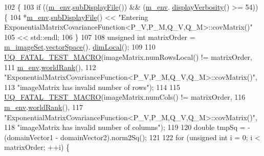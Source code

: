 \begin{DoxyCode}
102 \{
103   \textcolor{keywordflow}{if} ((\hyperlink{class_q_u_e_s_o_1_1_base_matrix_covariance_function_a2bf98f6576db775109e240a2d828c578}{m\_env}.\hyperlink{class_q_u_e_s_o_1_1_base_environment_a8a0064746ae8dddfece4229b9ad374d6}{subDisplayFile}()) && (\hyperlink{class_q_u_e_s_o_1_1_base_matrix_covariance_function_a2bf98f6576db775109e240a2d828c578}{m\_env}.
      \hyperlink{class_q_u_e_s_o_1_1_base_environment_a1fe5f244fc0316a0ab3e37463f108b96}{displayVerbosity}() >= 54)) \{
104     *\hyperlink{class_q_u_e_s_o_1_1_base_matrix_covariance_function_a2bf98f6576db775109e240a2d828c578}{m\_env}.\hyperlink{class_q_u_e_s_o_1_1_base_environment_a8a0064746ae8dddfece4229b9ad374d6}{subDisplayFile}() << \textcolor{stringliteral}{"Entering
       ExponentialMatrixCovarianceFunction<P\_V,P\_M,Q\_V,Q\_M>::covMatrix()"}
105                           << std::endl;
106   \}
107 
108   \textcolor{keywordtype}{unsigned} \textcolor{keywordtype}{int} matrixOrder = \hyperlink{class_q_u_e_s_o_1_1_base_matrix_covariance_function_aa6e05a29048771a3a327b82cea09d480}{m\_imageSet}.\hyperlink{class_q_u_e_s_o_1_1_vector_set_a923421590baf5bf93cf066e528f927dc}{vectorSpace}().
      \hyperlink{class_q_u_e_s_o_1_1_vector_space_a5829a1f4f996f8307c840b705144d666}{dimLocal}();
109 
110   \hyperlink{_defines_8h_a56d63d18d0a6d45757de47fcc06f574d}{UQ\_FATAL\_TEST\_MACRO}(imageMatrix.numRowsLocal() != matrixOrder,
111                       \hyperlink{class_q_u_e_s_o_1_1_base_matrix_covariance_function_a2bf98f6576db775109e240a2d828c578}{m\_env}.\hyperlink{class_q_u_e_s_o_1_1_base_environment_a78b57112bbd0e6dd0e8afec00b40ffa7}{worldRank}(),
112                       \textcolor{stringliteral}{"ExponentialMatrixCovarianceFunction<P\_V,P\_M,Q\_V,Q\_M>::covMatrix()"},
113                       \textcolor{stringliteral}{"imageMatrix has invalid number of rows"});
114 
115   \hyperlink{_defines_8h_a56d63d18d0a6d45757de47fcc06f574d}{UQ\_FATAL\_TEST\_MACRO}(imageMatrix.numCols() != matrixOrder,
116                       \hyperlink{class_q_u_e_s_o_1_1_base_matrix_covariance_function_a2bf98f6576db775109e240a2d828c578}{m\_env}.\hyperlink{class_q_u_e_s_o_1_1_base_environment_a78b57112bbd0e6dd0e8afec00b40ffa7}{worldRank}(),
117                       \textcolor{stringliteral}{"ExponentialMatrixCovarianceFunction<P\_V,P\_M,Q\_V,Q\_M>::covMatrix()"},
118                       \textcolor{stringliteral}{"imageMatrix has invalid number of columns"});
119 
120   \textcolor{keywordtype}{double} tmpSq = -(domainVector1 - domainVector2).norm2Sq();
121 
122   \textcolor{keywordflow}{for} (\textcolor{keywordtype}{unsigned} \textcolor{keywordtype}{int} i = 0; i < matrixOrder; ++i) \{

\end{DoxyCode}
